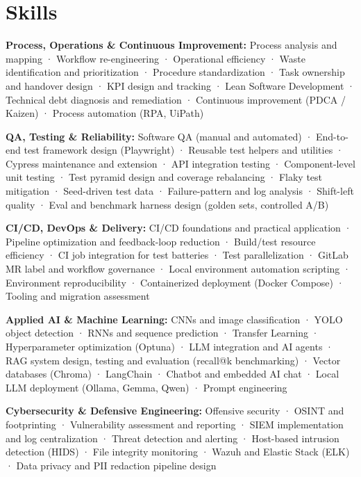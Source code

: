 \documentclass[10pt,a4paper]{article}
\newcommand{\cvskill}[2]{\par{\bfseries #1:} #2\par}
\begin{document}

\section{Skills}

\cvskill{Process, Operations \& Continuous Improvement}{Process analysis and mapping · Workflow re-engineering · Operational efficiency · Waste identification and prioritization · Procedure standardization · Task ownership and handover design · KPI design and tracking · Lean Software Development · Technical debt diagnosis and remediation · Continuous improvement (PDCA / Kaizen) · Process automation (RPA, UiPath)}
\cvskill{QA, Testing \& Reliability}{Software QA (manual and automated) · End-to-end test framework design (Playwright) · Reusable test helpers and utilities · Cypress maintenance and extension · API integration testing · Component-level unit testing · Test pyramid design and coverage rebalancing · Flaky test mitigation · Seed-driven test data · Failure-pattern and log analysis · Shift-left quality · Eval and benchmark harness design (golden sets, controlled A/B)}
\cvskill{CI/CD, DevOps \& Delivery}{CI/CD foundations and practical application · Pipeline optimization and feedback-loop reduction · Build/test resource efficiency · CI job integration for test batteries · Test parallelization · GitLab MR label and workflow governance · Local environment automation scripting · Environment reproducibility · Containerized deployment (Docker Compose) · Tooling and migration assessment}
\cvskill{Applied AI \& Machine Learning}{CNNs and image classification · YOLO object detection · RNNs and sequence prediction · Transfer Learning · Hyperparameter optimization (Optuna) · LLM integration and AI agents · RAG system design, testing and evaluation (recall@k benchmarking) · Vector databases (Chroma) · LangChain · Chatbot and embedded AI chat · Local LLM deployment (Ollama, Gemma, Qwen) · Prompt engineering}
\cvskill{Cybersecurity \& Defensive Engineering}{Offensive security · OSINT and footprinting · Vulnerability assessment and reporting · SIEM implementation and log centralization · Threat detection and alerting · Host-based intrusion detection (HIDS) · File integrity monitoring · Wazuh and Elastic Stack (ELK) · Data privacy and PII redaction pipeline design}
\end{document}
